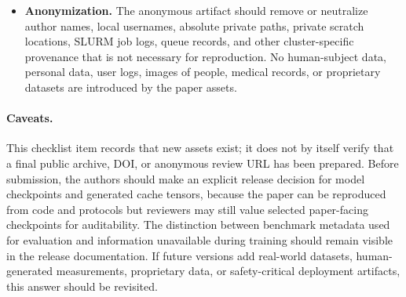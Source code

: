 \begin{itemize}
  \item \textbf{Anonymization.} The anonymous artifact should remove or
  neutralize author names, local usernames, absolute private paths, private
  scratch locations, SLURM job logs, queue records, and other cluster-specific
  provenance that is not necessary for reproduction. No human-subject data,
  personal data, user logs, images of people, medical records, or proprietary
  datasets are introduced by the paper assets.
\end{itemize}

\paragraph{Caveats.}
This checklist item records that new assets exist; it does not by itself verify
that a final public archive, DOI, or anonymous review URL has been prepared.
Before submission, the authors should make an explicit release decision for
model checkpoints and generated cache tensors, because the paper can be
reproduced from code and protocols but reviewers may still value selected
paper-facing checkpoints for auditability. The distinction between benchmark
metadata used for evaluation and information unavailable during training should
remain visible in the release documentation. If future versions add real-world
datasets, human-generated measurements, proprietary data, or safety-critical
deployment artifacts, this answer should be revisited.
